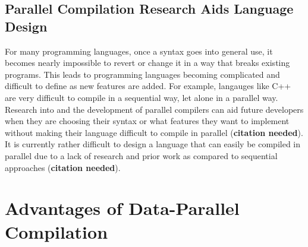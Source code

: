 \subsection{Parallel Compilation Research Aids Language Design}

For many programming languages, once a syntax goes into general use, it becomes
nearly impossible to revert or change it in a way that breaks existing programs.
This leads to programming languages becoming complicated and difficult to define as
new features are added. For example, langauges like C++ are very difficult to compile
in a sequential way, let alone in a parallel way. Research into and the development
of parallel compilers can aid future developers when they are choosing their
syntax or what features they want to implement without making their language
difficult to compile in parallel (\textbf{citation needed}). It is currently
rather difficult to design a language that can easily be compiled in parallel
due to a lack of research and prior work as compared to sequential approaches
(\textbf{citation needed}).

\section{Advantages of Data-Parallel Compilation}

